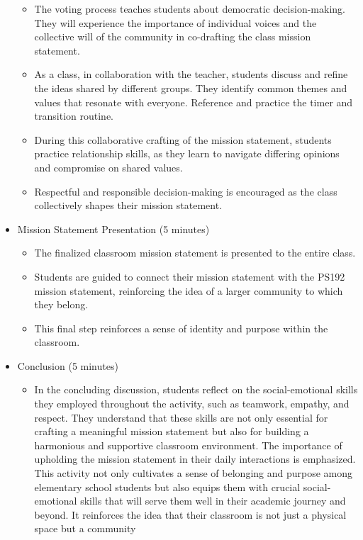 \documentclass[14pt, letterpaper, twoside]{article}
\begin{document}
\begin{itemize}
\begin{itemize}
					\item The voting process teaches students about democratic decision-making. They will experience the importance of individual voices and the collective will of the community in co-drafting
								the class mission statement.
					\item As a class, in collaboration with the teacher, students discuss and refine the ideas shared by different groups. They identify common themes and values that resonate with everyone.
								Reference and practice the timer and transition routine.
					\item During this collaborative crafting of the mission statement, students practice relationship skills, as they learn to navigate differing opinions and compromise on shared values.
					\item Respectful and responsible decision-making is encouraged as the class collectively shapes their mission statement.
				\end{itemize}
	\item Mission Statement Presentation (5 minutes)
				\begin{itemize}
					\item The finalized classroom mission statement is presented to the entire class.
					\item Students are guided to connect their mission statement with the PS192 mission statement, reinforcing the idea of a larger community to which they belong.
					\item This final step reinforces a sense of identity and purpose within the classroom.
				\end{itemize}
	\item Conclusion (5 minutes)
				\begin{itemize}
					\item In the concluding discussion, students reflect on the social-emotional skills they employed throughout the activity, such as teamwork, empathy, and respect. They understand that
								these skills are not only essential for crafting a meaningful mission statement but also for building a harmonious and supportive classroom environment. The importance of upholding the
								mission statement in their daily interactions is emphasized. This activity not only cultivates a sense of belonging and purpose among elementary school students but also equips them with
								crucial social-emotional skills that will serve them well in their academic journey and beyond. It reinforces the idea that their classroom is not just a physical space but a community

\end{itemize}
\end{itemize}
\end{document}
